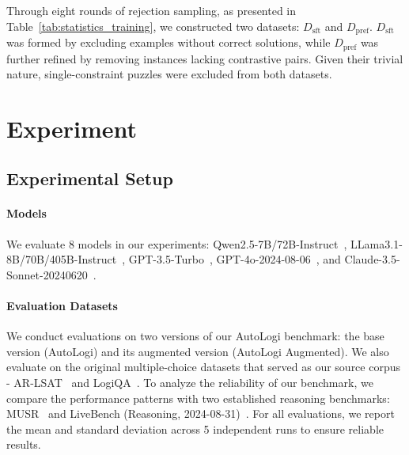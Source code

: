 \begin{table}[!t]
    \centering
    \small
    \caption{Statistics of our training data. 
 }
    \label{tab:statistics_training}
    \vskip -0.1in
\end{table}
Through eight rounds of rejection sampling, as presented in Table~\ref{tab:statistics_training}, we constructed two datasets: $D_{\text{sft}}$ and $D_{\text{pref}}$. $D_{\text{sft}}$ was formed by excluding examples without correct solutions, while $D_{\text{pref}}$ was further refined by removing instances lacking contrastive pairs. Given their trivial nature, single-constraint puzzles were excluded from both datasets.

\section{Experiment}
\subsection{Experimental Setup}

\paragraph{Models}
We evaluate 8 models in our experiments: Qwen2.5-7B/72B-Instruct~\cite{qwen2025qwen25technicalreport}, LLama3.1-8B/70B/405B-Instruct~\cite{dubey2024llama3herdmodels}, GPT-3.5-Turbo~\cite{ChatGPT}, GPT-4o-2024-08-06~\cite{openai2024gpt4technicalreport}, and Claude-3.5-Sonnet-20240620~\cite{cluade}.

\paragraph{Evaluation Datasets}
We conduct evaluations on two versions of our AutoLogi benchmark: the base version (AutoLogi) and its augmented version (AutoLogi Augmented). We also evaluate on the original multiple-choice datasets that served as our source corpus - AR-LSAT~\cite{zhong2021ar} and LogiQA~\cite{liu2020logiqachallengedatasetmachine}.
To analyze the reliability of our benchmark, we compare the performance patterns with two established reasoning benchmarks: MUSR~\cite{sprague2024musrtestinglimitschainofthought} and LiveBench (Reasoning, 2024-08-31)~\cite{white2024livebench}. 
For all evaluations, we report the mean and standard deviation across 5 independent runs to ensure reliable results.

